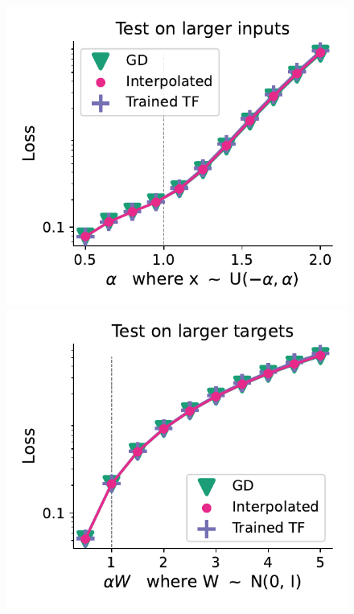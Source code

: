 \documentclass{article}
\theoremstyle{plain}
\theoremstyle{definition}
\theoremstyle{remark}
\begin{document}
\begin{figure}
\begin{center}
\begin{minipage}{.24\textwidth}
\begin{center}
  \end{center}
  \vspace{-10pt}
\end{minipage}
\begin{minipage}{.24\textwidth}
  \centering
  \begin{center}
    \includegraphics[width=1.\textwidth]{Final_figures/cycle/8192/normal_28.pdf}
  \end{center}
  \vspace{-10pt}
\end{minipage}
\begin{minipage}{.24\textwidth}
  \centering
  \begin{center}
    \includegraphics[width=1.\textwidth]{Final_figures/cycle/8192/normal_27.pdf}

\end{center}
\end{minipage}
\end{center}
\end{figure}
\end{document}
